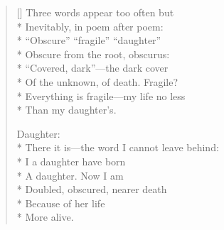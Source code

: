 \label{ch:the_poems_of_summer}
\settowidth{\versewidth}{                                        Daughter:}
\begin{verse}[\versewidth]
Three words appear too often but\\*
Inevitably, in poem after poem: \\*
``Obscure'' ``fragile'' ``daughter''\\*
Obscure from the root, obscurus:\\*
``Covered, dark''---the dark cover\\*
Of the unknown, of death. Fragile?\\*
Everything is fragile---my life no less\\*
Than my daughter's.

                                        Daughter:\\*
There it is---the word I cannot leave behind:\\*
I a daughter have born\\*
A daughter.     Now I am\\*
Doubled, obscured, nearer death\\*
Because of her life\\*
More alive.
\end{verse}
